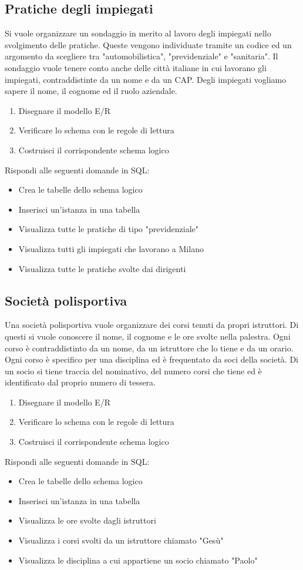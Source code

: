 \documentclass{article}
\begin{document}
	\subsection{Pratiche degli impiegati}
	Si vuole organizzare un sondaggio in merito al lavoro degli impiegati nello svolgimento delle pratiche. Queste vengono individuate tramite un codice ed un argomento da scegliere tra "automobilistica", "previdenziale" e "sanitaria". Il sondaggio vuole tenere conto anche delle città italiane in cui lavorano gli impiegati, contraddistinte da un nome e da un CAP. Degli impiegati vogliamo sapere il nome, il cognome ed il ruolo aziendale.
	\begin{enumerate}
		\item Disegnare il modello E/R
		\item Verificare lo schema con le regole di lettura
		\item Costruisci il corrispondente schema logico
	\end{enumerate}
	Rispondi alle seguenti domande in SQL:
	\begin{itemize}
		\item Crea le tabelle dello schema logico
		\item Inserisci un'istanza in una tabella
		\item Visualizza tutte le pratiche di tipo "previdenziale"
		\item Visualizza tutti gli impiegati che lavorano a Milano
		\item Visualizza tutte le pratiche svolte dai dirigenti
	\end{itemize}

	\subsection{Società polisportiva}
	Una società polisportiva vuole organizzare dei corsi tenuti da propri istruttori. Di questi si vuole conoscere il nome, il cognome e le ore svolte nella palestra. Ogni corso è contraddistinto da un nome, da un istruttore che lo tiene e da un orario. Ogni corso è specifico per una disciplina ed è frequentato da soci della società. Di un socio si tiene traccia del nominativo, del numero corsi che tiene ed è identificato dal proprio numero di tessera.
	\begin{enumerate}
		\item Disegnare il modello E/R
		\item Verificare lo schema con le regole di lettura
		\item Costruisci il corrispondente schema logico
	\end{enumerate}
	Rispondi alle seguenti domande in SQL:
	\begin{itemize}
		\item Crea le tabelle dello schema logico
		\item Inserisci un'istanza in una tabella
		\item Visualizza le ore svolte dagli istruttori
		\item Visualizza i corsi svolti da un istruttore chiamato "Gesù"
		\item Visualizza le disciplina a cui appartiene un socio chiamato "Paolo"
	\end{itemize}
\end{document}
